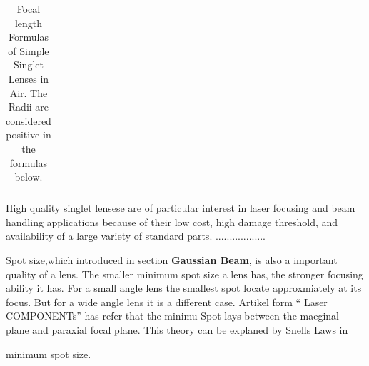 \begin{table}
\begin{tabular}{|c|c|c|}
\hline
\end{tabular}
\caption{Focal length Formulas of Simple Singlet Lenses in Air.  
				 The Radii are considered positive in the formulas below.}
\label{tab:lenses_focal_length}
\end{table}


High quality singlet lensese are of particular interest in laser focusing and beam handling applications because of their low cost, high damage threshold, and availability of a large variety of standard parts. ..................

Spot size,which introduced in section \textbf{Gaussian Beam}, is also a important quality of a lens. The smaller minimum spot size a lens has, the stronger focusing ability it has.  For a small angle lens the smallest spot locate approxmiately at its focus. But for a wide angle lens it is a different case.
Artikel form "` Laser COMPONENTs"' has refer that the minimu Spot lays between the maeginal plane and paraxial focal plane. This theory can be explaned by Snells Laws in 

minimum spot size.

	